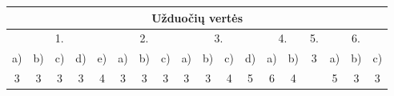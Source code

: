 \documentclass[a4paper]{article}
\begin{document}
\begin{enumerate}
\end{enumerate}

\begin{table}[!htpb]
      \centering
      \begin{tabular}{|cccccccccccccccccc|}
            \hline
            \multicolumn{18}{|c|}{Užduočių vertės}

            \\
            \hline
            \multicolumn{5}{|c|}{1.}
                                                    &
            \multicolumn{3}{c|}{2.}                 &
            \multicolumn{4}{c|}{3.}
                                                    & \multicolumn{2}{c|}{4.} &
            \multicolumn{1}{c|}{5.}                 & \multicolumn{3}{c|}{6.}
            \\ \hline
            \multicolumn{1}{|c|}{a)}                & \multicolumn{1}{c|}{b)} &
            \multicolumn{1}{c|}{c)}                 & \multicolumn{1}{c|}{d)} &
            \multicolumn{1}{c|}{e)}                 &
            \multicolumn{1}{c|}{a)}                 & \multicolumn{1}{c|}{b)} &
            \multicolumn{1}{c|}{c)}                 &
            \multicolumn{1}{c|}{a)}                 & \multicolumn{1}{c|}{b)} &
            \multicolumn{1}{c|}{c)}                 &
            \multicolumn{1}{c|}{d)}                 & \multicolumn{1}{c|}{a)} &
            \multicolumn{1}{c|}{b)}                 &
            \multicolumn{1}{c|}{\multirow{2}{*}{3}} & \multicolumn{1}{c|}{a)} &
            \multicolumn{1}{c|}{b)}                 & c)
            \\
            \multicolumn{1}{|c|}{3}                 & \multicolumn{1}{c|}{3}  &
            \multicolumn{1}{c|}{3}                  & \multicolumn{1}{c|}{3}  &
            \multicolumn{1}{c|}{4}                  &
            \multicolumn{1}{c|}{3}                  & \multicolumn{1}{c|}{3}  &
            \multicolumn{1}{c|}{3}                  &
            \multicolumn{1}{c|}{3}                  & \multicolumn{1}{c|}{3}  &
            \multicolumn{1}{c|}{4}                  &
            \multicolumn{1}{c|}{5}                  & \multicolumn{1}{c|}{6}  &
            \multicolumn{1}{c|}{4}                  &
            \multicolumn{1}{c|}{}                   & \multicolumn{1}{c|}{5}  &
            \multicolumn{1}{c|}{3}                  & 3
            \\ \hline
      \end{tabular}
\end{table}
\end{document}
